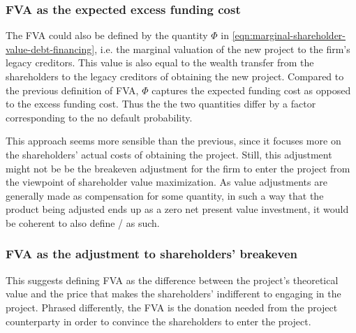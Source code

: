 \documentclass[../main.tex]{subfiles}
\begin{document}
        \subsubsection*{FVA as the expected excess funding cost}
            The FVA could also be defined by the quantity $\Phi$ in \cref{eqn:marginal-shareholder-value-debt-financing}, 
            i.e. the marginal valuation of the new project to the firm's legacy creditors. 
            This value is also equal to the wealth transfer from the shareholders to the legacy creditors
            of obtaining the new project.
            Compared to the previous definition of FVA, 
            $\Phi$ captures the expected funding cost as opposed to the excess funding cost.
            Thus the the two quantities differ by a factor corresponding to the no default probability.

            This approach seems more sensible than the previous, 
            since it focuses more on the shareholders' actual costs of obtaining the project.
            Still, this adjustment might not be be the breakeven adjustment
            for the firm to enter the project from the viewpoint of shareholder value maximization.
            As value adjustments are generally made as compensation for some quantity,
            in such a way that the product being adjusted ends up as a zero net present value investment,
            it would be coherent to also define \FVA/ as such.
            
        \subsubsection*{FVA as the adjustment to shareholders' breakeven}
            This suggests defining FVA as the difference between the project's theoretical value
            and the price that makes the shareholders' indifferent to engaging in the project.
            Phrased differently, the FVA is the donation needed from the project counterparty in order
            to convince the shareholders to enter the project.
\end{document}
